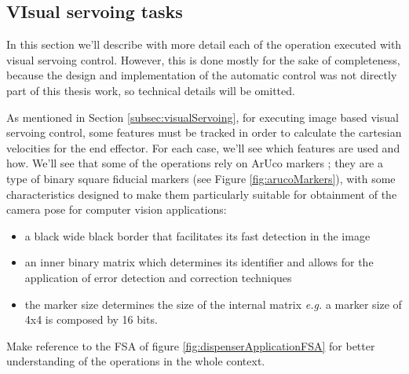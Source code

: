 \subsection{VIsual servoing tasks}\label{subsec:visualServoingNellaAction}
In this section we'll describe with more detail each of the operation executed with visual servoing control. However, this is done mostly for the sake of completeness, because the design and implementation of the automatic control was not directly part of this thesis work, so technical details will be omitted.

As mentioned in Section \ref{subsec:visualServoing}, for executing image based visual servoing control, some features must be tracked in order to calculate the cartesian velocities for the end effector. For each case, we'll see which features are used and how. We'll see that some of the operations rely on ArUco markers \parencite{aruco}; they are a type of binary square fiducial markers (see Figure \ref{fig:arucoMarkers}), with some characteristics designed to make them particularly suitable for obtainment of the camera pose for computer vision applications:
\begin{itemize}
	\item a black wide black border that facilitates its fast detection in the image\
	\item an inner binary matrix which determines its identifier and allows for the application of error detection and correction techniques
	\item  the marker size determines the size of the internal matrix \textit{e.g.} a marker size of 4x4 is composed by 16 bits.
\end{itemize}
Make reference to the \ac{FSA} of figure \ref{fig:dispenserApplicationFSA} for better understanding of the operations in the whole context.

